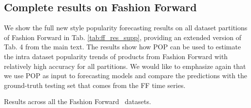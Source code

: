 \documentclass[runningheads]{llncs}
\newcommand{\snamebig}[0] {POP\xspace}
\begin{document}
 \subsection{Complete results on Fashion Forward}\label{sec:ff}
We show the full new style popularity forecasting results on all dataset partitions of Fashion Forward in Tab. \ref{tab:ff_res_supp}, providing an extended version of Tab. 4 from the main text. The results show how \snamebig can be used to estimate the intra dataset popularity trends of products from Fashion Forward with relatively high accuracy for all partitions. We would like to emphasize again that we use \snamebig as input to forecasting models and compare the predictions with the ground-truth testing set that comes from the FF time series.
\begin{table}[h!]
    \centering
    \caption{Results across all the Fashion Forward~\cite{al2017fashion} datasets.}


\end{table}
\end{document}
